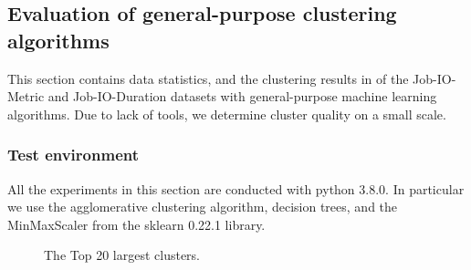 \documentclass[]{llncs}
\begin{document}
\subsection{Evaluation of general-purpose clustering algorithms}
This section contains data statistics, and the clustering results in  of the Job-IO-Metric and Job-IO-Duration datasets with general-purpose machine learning algorithms.
Due to lack of tools, we determine cluster quality on a small scale.

\subsubsection{Test environment}
All the experiments in this section are conducted with python 3.8.0.
In particular we use the agglomerative clustering algorithm, decision trees, and the MinMaxScaler from the sklearn 0.22.1 library.

\begin{figure}
  \caption{The Top 20 largest clusters.}
  \label{fig:datasets_clustering_results}
\end{figure}
\end{document}
